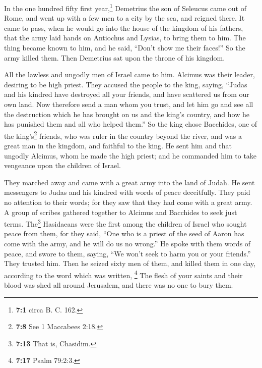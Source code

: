  In the one hundred fifty first year,\footnote{\textbf{7:1}
  circa B. C. 162.} Demetrius the son of Seleucus came out of Rome, and
went up with a few men to a city by the sea, and reigned there.
 It came to pass, when he would go into the house of the
kingdom of his fathers, that the army laid hands on Antiochus and
Lysias, to bring them to him.  The thing became known to
him, and he said, ``Don't show me their faces!''  So the
army killed them. Then Demetrius sat upon the throne of his kingdom.

 All the lawless and ungodly men of Israel came to him.
Alcimus was their leader, desiring to be high priest. 
They accused the people to the king, saying, ``Judas and his kindred
have destroyed all your friends, and have scattered us from our own
land.  Now therefore send a man whom you trust, and let
him go and see all the destruction which he has brought on us and the
king's country, and how he has punished them and all who helped them.''
 So the king chose Bacchides, one of the king's\footnote{\textbf{7:8}
  See 1 Maccabees 2:18.} friends, who was ruler in the country beyond
the river, and was a great man in the kingdom, and faithful to the king.
 He sent him and that ungodly Alcimus, whom he made the
high priest; and he commanded him to take vengeance upon the children of
Israel.

 They marched away and came with a great army into the
land of Judah. He sent messengers to Judas and his kindred with words of
peace deceitfully.  They paid no attention to their
words; for they saw that they had come with a great army.
 A group of scribes gathered together to Alcimus and
Bacchides to seek just terms.  The\footnote{\textbf{7:13}
  That is, Chasidim.} Hasidaeans were the first among the children of
Israel who sought peace from them,  for they said, ``One
who is a priest of the seed of Aaron has come with the army, and he will
do us no wrong.''  He spoke with them words of peace, and
swore to them, saying, ``We won't seek to harm you or your friends.''
 They trusted him. Then he seized sixty men of them, and
killed them in one day, according to the word which was written,
 \footnote{\textbf{7:17} Psalm 79:2:3.} The flesh of your
saints and their blood was shed all around Jerusalem, and there was no
one to bury them.

